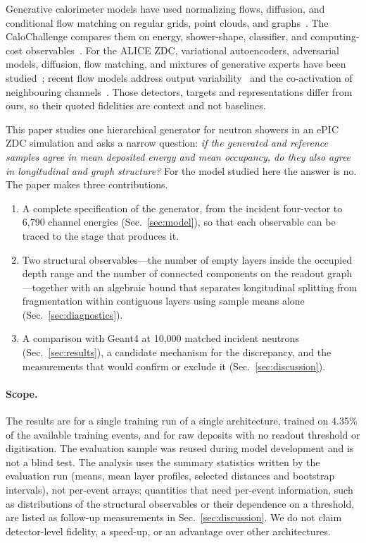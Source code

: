 \documentclass[11pt]{article}
\begin{document}
Generative calorimeter models have used normalizing flows, diffusion, and conditional flow matching on regular grids, point clouds, and graphs~\cite{caloflow,calodiffusion,calograph,caloclouds2,calodream}. The CaloChallenge compares them on energy, shower-shape, classifier, and computing-cost observables~\cite{calochallenge,kansalmetrics}. For the ALICE ZDC, variational autoencoders, adversarial models, diffusion, flow matching, and mixtures of generative experts have been studied~\cite{dubinskizdc,kitazdc,fasterzdc,expertsim,wojnar2025}; recent flow models address output variability~\cite{majerziaf} and the co-activation of neighbouring channels~\cite{majerz2026}. Those detectors, targets and representations differ from ours, so their quoted fidelities are context and not baselines.

This paper studies one hierarchical generator for neutron showers in an ePIC ZDC simulation and asks a narrow question: \emph{if the generated and reference samples agree in mean deposited energy and mean occupancy, do they also agree in longitudinal and graph structure?} For the model studied here the answer is no. The paper makes three contributions.
\begin{enumerate}
 \item A complete specification of the generator, from the incident four-vector to 6,790 channel energies (Sec.~\ref{sec:model}), so that each observable can be traced to the stage that produces it.
 \item Two structural observables---the number of empty layers inside the occupied depth range and the number of connected components on the readout graph---together with an algebraic bound that separates longitudinal splitting from fragmentation within contiguous layers using sample means alone (Sec.~\ref{sec:diagnostics}).
 \item A comparison with Geant4 at 10,000 matched incident neutrons (Sec.~\ref{sec:results}), a candidate mechanism for the discrepancy, and the measurements that would confirm or exclude it (Sec.~\ref{sec:discussion}).
\end{enumerate}

\paragraph{Scope.} The results are for a single training run of a single architecture, trained on 4.35\% of the available training events, and for raw deposits with no readout threshold or digitisation. The evaluation sample was reused during model development and is not a blind test. The analysis uses the summary statistics written by the evaluation run (means, mean layer profiles, selected distances and bootstrap intervals), not per-event arrays; quantities that need per-event information, such as distributions of the structural observables or their dependence on a threshold, are listed as follow-up measurements in Sec.~\ref{sec:discussion}. We do not claim detector-level fidelity, a speed-up, or an advantage over other architectures.
\end{document}
